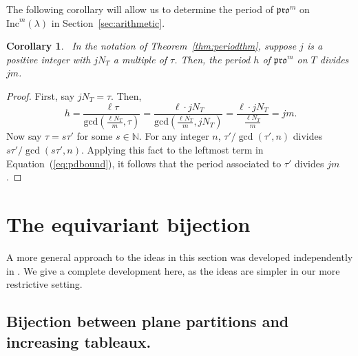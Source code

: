 \documentclass[12pt]{amsart}
\newtheorem{corollary}[theorem]{Corollary}
\theoremstyle{definition}
\theoremstyle{remark}
\numberwithin{equation}{section}
\newcommand{\inc}{\ensuremath{\mathrm{Inc}}}
\newcommand{\pro}{\mathfrak{pro}}
\begin{document}
The following corollary will allow us to determine the period of $\pro^m$ on $\inc^m(\lambda)$ in Section~\ref{sec:arithmetic}. 
\\
\begin{corollary}~\label{corr:pdbound}
In the notation of Theorem~\ref{thm:periodthm}, suppose $j$ is a positive integer with $j N_T$ a multiple of $\tau$. Then, the period $h$ of $\pro^m$ on $T$ divides $j m$. 
\end{corollary} 
\begin{proof}
First, say $j N_T = \tau$. Then,
\begin{equation}~\label{eq:pdbound} h=  \frac{\ell \tau}{\text{gcd}(\frac{\ell N_T}{m},\tau)} = \frac{\ell \cdot j N_T}{\text{gcd}(\frac{\ell N_T}{m},j N_T)} = \frac{\ell \cdot j N_T}{\frac{\ell N_T}{m}} = jm. 
\end{equation}
Now say $\tau = s \tau'$ for some $s \in \mathbb{N}$. For any integer $n$, $\tau'/\gcd(\tau',n)$ divides $s \tau'/\gcd(s \tau',n)$. Applying this fact to the leftmost term in Equation~(\ref{eq:pdbound}), it follows that the period associated to $\tau'$ divides $j m$. 
\end{proof}

\section{The equivariant bijection}\label{sec:equivariant}

A more general approach to the ideas in this section was developed independently in \cite{Dilks.Striker.Vorland}. We give a complete development here, as the ideas are simpler in our more restrictive setting.

\subsection{Bijection between plane partitions and increasing tableaux.} 
\end{document}
